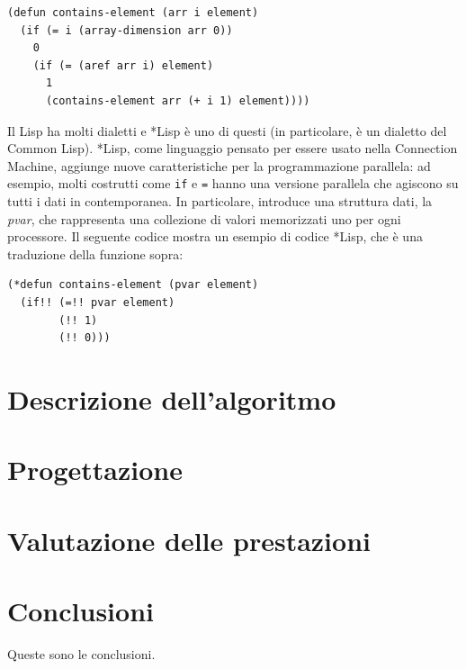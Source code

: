 \documentclass[12pt,a4paper,openright,twoside]{report}
\begin{document}
\begin{lstlisting}[caption=Esempio di codice Lisp]
(defun contains-element (arr i element)
  (if (= i (array-dimension arr 0))
    0
    (if (= (aref arr i) element)
      1
      (contains-element arr (+ i 1) element))))
\end{lstlisting}

Il Lisp ha molti dialetti e *Lisp è uno di questi (in particolare, è un dialetto del Common Lisp). *Lisp, come linguaggio pensato per essere usato nella Connection Machine, aggiunge nuove caratteristiche per la programmazione parallela: ad esempio, molti costrutti come \verb|if| e \verb|=| hanno una versione parallela che agiscono su tutti i dati in contemporanea. In particolare, introduce una struttura dati, la \textit{pvar}, che rappresenta una collezione di valori memorizzati uno per ogni processore. Il seguente codice mostra un esempio di codice *Lisp, che è una traduzione della funzione sopra:

\begin{lstlisting}[caption=Esempio di codice *Lisp]
(*defun contains-element (pvar element)
  (if!! (=!! pvar element)
        (!! 1)
        (!! 0)))
\end{lstlisting}

\chapter{Descrizione dell'algoritmo}

\chapter{Progettazione}

\chapter{Valutazione delle prestazioni}

\chapter*{Conclusioni}


Queste sono le conclusioni.\\
\end{document}

